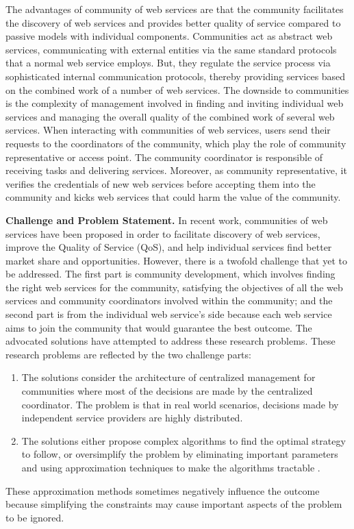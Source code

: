 \documentclass[10pt,journal,cspaper,compsoc]{IEEEtran}
\begin{document}
The advantages of community of web services are that the community facilitates the discovery of web services and provides better quality of service compared to passive models with individual components. Communities act as abstract web services, communicating with external entities via the same standard protocols that a normal web service employs. But, they regulate the service process via sophisticated internal communication protocols, thereby providing services based on the combined work of a number of web services. The downside to communities is the complexity of management involved in finding and inviting individual web services and managing the overall quality of the combined work of several web services.
When interacting with communities of web services, users send their requests to the coordinators of the community, which play the role of community representative or access point. The community coordinator is responsible of receiving tasks and delivering services. Moreover, as community representative, it verifies the credentials of new web services before accepting them into the community and kicks web services that could harm the value of the community. 

\textbf{Challenge and Problem Statement.} In recent work, communities of web services have been proposed in order to facilitate discovery of web services, improve the Quality of Service (QoS), and help individual services find better market share and opportunities. However, there is a twofold challenge that yet to be addressed. The first part is community development, which involves finding the right web services for the community, satisfying the objectives of all the web services and community coordinators involved within the community; and the second part is from the individual web service's side because each web service aims to join the community that would guarantee the best outcome. The advocated solutions \cite{conf/webist/MaamarLBTS07, 10.1109/ARES.2008.7, journals/soca/XuYLZB11, 10.1109/TSC.2012.12, managing-hela-jalel, DBLP:conf/IEEEscc/KhosravifarABT11, DBLP:conf/IEEEscc/LimTMB12} have attempted to address these research problems. These research problems are reflected by the two challenge parts: 
\begin{enumerate}
	\item The solutions consider the architecture of centralized management for communities where most of the decisions are made by the centralized coordinator. The problem is that in real world scenarios, decisions made by independent service providers are highly distributed.
	\item The solutions either propose complex algorithms \cite{DBLP:conf/IEEEscc/LimTMB12, 10.1109/TSC.2012.12, 10.1109/TSC.2014.2312940} to find the optimal strategy to follow, or oversimplify the problem by eliminating important parameters and using approximation techniques to make the algorithms tractable \cite{10.1109/TSC.2012.12}.
\end{enumerate}
These approximation methods sometimes negatively influence the outcome because simplifying the constraints may cause important aspects of the problem to be ignored. 
\end{document}
